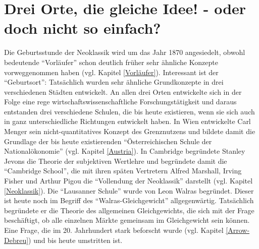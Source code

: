 %
%
%

\chapter{Drei Orte, die gleiche Idee! - oder doch nicht so einfach?}
\label{Marginalismus}

Die Geburtsstunde der Neoklassik wird um das Jahr 1870 angesiedelt, obwohl bedeutende "`Vorläufer"' schon deutlich früher sehr ähnliche Konzepte vorweggenommen haben (vgl. Kapitel \ref{Vorläufer}). Interessant ist der "`Geburtsort"': Tatsächlich wurden sehr ähnliche Grundkonzepte in drei verschiedenen Städten entwickelt. An allen drei Orten entwickelte sich in der Folge eine rege wirtschaftswissenschaftliche Forschungstätigkeit und daraus entstanden drei verschiedene Schulen, die bis heute existieren, wenn sie sich auch in ganz unterschiedliche Richtungen entwickelt haben. In Wien entwickelte Carl Menger sein nicht-quantitatives Konzept des Grenznutzens und bildete damit die Grundlage der bis heute existierenden "`Österreichischen Schule der Nationalökonomie"' (vgl. Kapitel \ref{Austria}). In Cambridge begründete Stanley Jevons die Theorie der subjektiven Wertlehre und begründete damit die "`Cambridge School"', die mit ihren späten Vertretern Alfred Marshall, Irving Fisher und Arthur Pigou die "`Vollendung der Neoklassik"' darstellt (vgl. Kapitel \ref{Neoklassik}). Die "`Lausanner Schule"' wurde von Leon Walras begründet. Dieser ist heute noch im Begriff des "`Walras-Gleichgewicht"' allgegenwärtig. Tatsächlich begründete er die Theorie des allgemeinen Gleichgewichts, die sich mit der Frage beschäftigt, ob alle einzelnen Märkte gemeinsam im Gleichgewicht sein können. Eine Frage, die im 20. Jahrhundert stark beforscht wurde (vgl. Kapitel \ref{Arrow-Debreu}) und bis heute umstritten ist.

